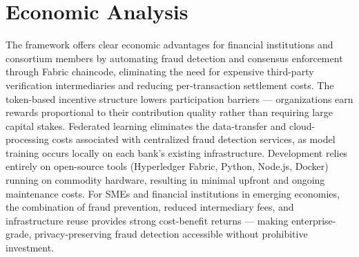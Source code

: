 \section{Economic Analysis}
The framework offers clear economic advantages for financial institutions and consortium members by automating fraud detection and consensus enforcement through Fabric chaincode, eliminating the need for expensive third-party verification intermediaries and reducing per-transaction settlement costs. The token-based incentive structure lowers participation barriers — organizations earn rewards proportional to their contribution quality rather than requiring large capital stakes. Federated learning eliminates the data-transfer and cloud-processing costs associated with centralized fraud detection services, as model training occurs locally on each bank's existing infrastructure. Development relies entirely on open-source tools (Hyperledger Fabric, Python, Node.js, Docker) running on commodity hardware, resulting in minimal upfront and ongoing maintenance costs. For SMEs and financial institutions in emerging economies, the combination of fraud prevention, reduced intermediary fees, and infrastructure reuse provides strong cost-benefit returns — making enterprise-grade, privacy-preserving fraud detection accessible without prohibitive investment.

